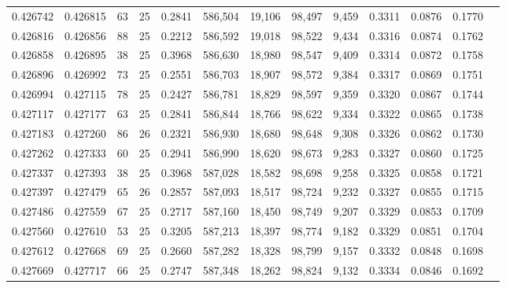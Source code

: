 \begin{tabular}{rrrrrrrrrrrrr}
0.426742 & 0.426815 &    63 &  25 &                                     0.2841 & 586,504 &  19,106 &  98,497 &   9,459 & 0.3311 & 0.0876 & 0.1770 \\
0.426816 & 0.426856 &    88 &  25 &                                     0.2212 & 586,592 &  19,018 &  98,522 &   9,434 & 0.3316 & 0.0874 & 0.1762 \\
0.426858 & 0.426895 &    38 &  25 &                                     0.3968 & 586,630 &  18,980 &  98,547 &   9,409 & 0.3314 & 0.0872 & 0.1758 \\
0.426896 & 0.426992 &    73 &  25 &                                     0.2551 & 586,703 &  18,907 &  98,572 &   9,384 & 0.3317 & 0.0869 & 0.1751 \\
0.426994 & 0.427115 &    78 &  25 &                                     0.2427 & 586,781 &  18,829 &  98,597 &   9,359 & 0.3320 & 0.0867 & 0.1744 \\
0.427117 & 0.427177 &    63 &  25 &                                     0.2841 & 586,844 &  18,766 &  98,622 &   9,334 & 0.3322 & 0.0865 & 0.1738 \\
0.427183 & 0.427260 &    86 &  26 &                                     0.2321 & 586,930 &  18,680 &  98,648 &   9,308 & 0.3326 & 0.0862 & 0.1730 \\
0.427262 & 0.427333 &    60 &  25 &                                     0.2941 & 586,990 &  18,620 &  98,673 &   9,283 & 0.3327 & 0.0860 & 0.1725 \\
0.427337 & 0.427393 &    38 &  25 &                                     0.3968 & 587,028 &  18,582 &  98,698 &   9,258 & 0.3325 & 0.0858 & 0.1721 \\
0.427397 & 0.427479 &    65 &  26 &                                     0.2857 & 587,093 &  18,517 &  98,724 &   9,232 & 0.3327 & 0.0855 & 0.1715 \\
0.427486 & 0.427559 &    67 &  25 &                                     0.2717 & 587,160 &  18,450 &  98,749 &   9,207 & 0.3329 & 0.0853 & 0.1709 \\
0.427560 & 0.427610 &    53 &  25 &                                     0.3205 & 587,213 &  18,397 &  98,774 &   9,182 & 0.3329 & 0.0851 & 0.1704 \\
0.427612 & 0.427668 &    69 &  25 &                                     0.2660 & 587,282 &  18,328 &  98,799 &   9,157 & 0.3332 & 0.0848 & 0.1698 \\
0.427669 & 0.427717 &    66 &  25 &                                     0.2747 & 587,348 &  18,262 &  98,824 &   9,132 & 0.3334 & 0.0846 & 0.1692 \\

\end{tabular}
